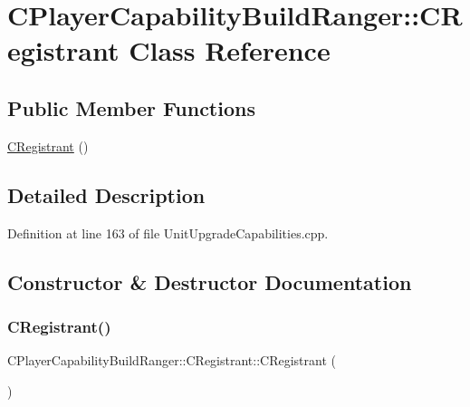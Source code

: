 \hypertarget{classCPlayerCapabilityBuildRanger_1_1CRegistrant}{}\section{C\+Player\+Capability\+Build\+Ranger\+:\+:C\+Registrant Class Reference}
\label{classCPlayerCapabilityBuildRanger_1_1CRegistrant}
\subsection*{Public Member Functions}
\begin{DoxyCompactItemize}
\item 
\hyperlink{classCPlayerCapabilityBuildRanger_1_1CRegistrant_a8fb4327aa5143d6818e2451fc6ff2e9c}{C\+Registrant} ()
\end{DoxyCompactItemize}


\subsection{Detailed Description}


Definition at line 163 of file Unit\+Upgrade\+Capabilities.\+cpp.



\subsection{Constructor \& Destructor Documentation}
\hypertarget{classCPlayerCapabilityBuildRanger_1_1CRegistrant_a8fb4327aa5143d6818e2451fc6ff2e9c}{}\label{classCPlayerCapabilityBuildRanger_1_1CRegistrant_a8fb4327aa5143d6818e2451fc6ff2e9c} 
\subsubsection{\texorpdfstring{C\+Registrant()}{CRegistrant()}}
{\footnotesize\ttfamily C\+Player\+Capability\+Build\+Ranger\+::\+C\+Registrant\+::\+C\+Registrant (\begin{DoxyParamCaption}{ }\end{DoxyParamCaption})}



